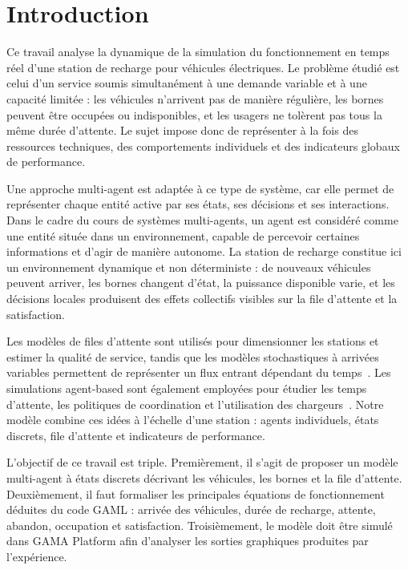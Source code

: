 \documentclass[11pt]{article}
\begin{document}
\section{Introduction}
Ce travail analyse la dynamique de la simulation du fonctionnement en temps réel d'une station de recharge pour véhicules électriques. Le problème étudié est celui d'un service soumis simultanément à une demande variable et à une capacité limitée : les véhicules n'arrivent pas de manière régulière, les bornes peuvent être occupées ou indisponibles, et les usagers ne tolèrent pas tous la même durée d'attente. Le sujet impose donc de représenter à la fois des ressources techniques, des comportements individuels et des indicateurs globaux de performance.

Une approche multi-agent est adaptée à ce type de système, car elle permet de représenter chaque entité active par ses états, ses décisions et ses interactions. Dans le cadre du cours de systèmes multi-agents, un agent est considéré comme une entité située dans un environnement, capable de percevoir certaines informations et d'agir de manière autonome. La station de recharge constitue ici un environnement dynamique et non déterministe : de nouveaux véhicules peuvent arriver, les bornes changent d'état, la puissance disponible varie, et les décisions locales produisent des effets collectifs visibles sur la file d'attente et la satisfaction.

Les modèles de files d'attente sont utilisés pour dimensionner les stations et estimer la qualité de service, tandis que les modèles stochastiques à arrivées variables permettent de représenter un flux entrant dépendant du temps~\cite{kim2017}. Les simulations agent-based sont également employées pour étudier les temps d'attente, les politiques de coordination et l'utilisation des chargeurs~\cite{garcia2018,karlsson2023}. Notre modèle combine ces idées à l'échelle d'une station : agents individuels, états discrets, file d'attente et indicateurs de performance.

L'objectif de ce travail est triple. Premièrement, il s'agit de proposer un modèle multi-agent à états discrets décrivant les véhicules, les bornes et la file d'attente. Deuxièmement, il faut formaliser les principales équations de fonctionnement déduites du code GAML : arrivée des véhicules, durée de recharge, attente, abandon, occupation et satisfaction. Troisièmement, le modèle doit être simulé dans GAMA Platform afin d'analyser les sorties graphiques produites par l'expérience.
\end{document}
